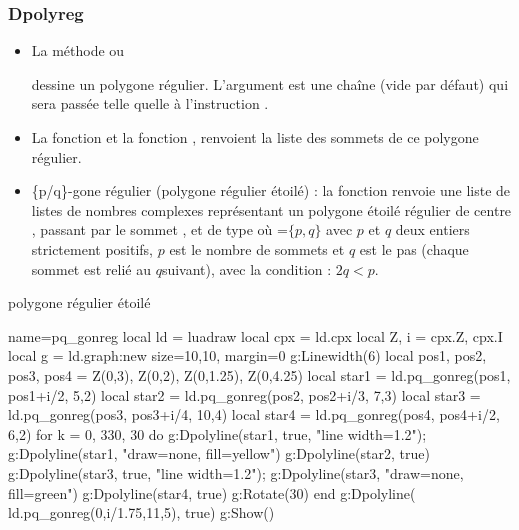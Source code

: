 \subsubsection{Dpolyreg}
\begin{itemize}
    \item La méthode  ou \par {} dessine un polygone régulier. L'argument  est une chaîne (vide par défaut) qui sera passée telle quelle à l'instruction \drawcmd.
    \item La fonction  et la fonction , renvoient la liste des sommets de ce polygone régulier.
    \item \{p/q\}-gone régulier (polygone régulier étoilé) : la fonction  renvoie une liste de listes de nombres complexes représentant un polygone étoilé régulier de centre , passant par le sommet , et de type  où =$\{p,q\}$ avec $p$ et $q$ deux entiers strictement positifs, $p$ est le nombre de sommets et $q$ est le pas (chaque sommet est relié au $q$\ieme suivant), avec la condition : $2q <p$.
\end{itemize}

\begin{demo}{polygone régulier étoilé}
\begin{luadraw}{name=pq_gonreg}
local ld = luadraw
local cpx = ld.cpx
local Z, i = cpx.Z, cpx.I
local g = ld.graph:new{ size={10,10}, margin=0 }
g:Linewidth(6)
local pos1, pos2, pos3, pos4 = Z(0,3), Z(0,2), Z(0,1.25), Z(0,4.25)
local star1 = ld.pq_gonreg(pos1, pos1+i/2, {5,2})
local star2 = ld.pq_gonreg(pos2, pos2+i/3, {7,3})
local star3 = ld.pq_gonreg(pos3, pos3+i/4, {10,4})
local star4 = ld.pq_gonreg(pos4, pos4+i/2, {6,2})
for k = 0, 330, 30 do
    g:Dpolyline(star1, true, "line width=1.2"); g:Dpolyline(star1, "draw=none, fill=yellow")
    g:Dpolyline(star2, true)
    g:Dpolyline(star3, true, "line width=1.2"); g:Dpolyline(star3, "draw=none, fill=green")
    g:Dpolyline(star4, true)
    g:Rotate(30)
end
g:Dpolyline( ld.pq_gonreg(0,i/1.75,{11,5}), true)
g:Show()
\end{luadraw}
\end{demo}

